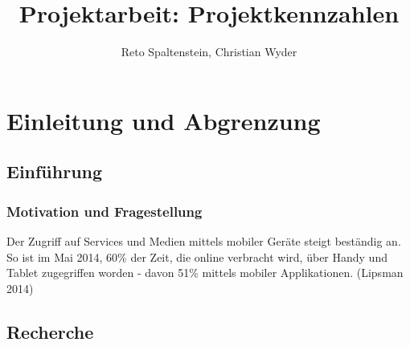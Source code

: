 




\makeatletter
\def\maxwidth{\ifdim\Gin@nat@width>\linewidth\linewidth
\else\Gin@nat@width\fi}
\makeatother
\let\Oldincludegraphics\includegraphics
\renewcommand{\includegraphics}[1]{\Oldincludegraphics[width=\maxwidth]{#1}}

\VerbatimFootnotes

\setlength{\parindent}{0pt}
\setlength{\parskip}{6pt plus 2pt minus 1pt}
\setlength{\emergencystretch}{3em}  %
\providecommand{\tightlist}{%
  \setlength{\itemsep}{0pt}\setlength{\parskip}{0pt}}
\VerbatimFootnotes %

\title{Projektarbeit: Projektkennzahlen}
\author{Reto Spaltenstein, Christian Wyder}



\setcounter{page}{1}


\tableofcontents
\newpage

\part[Präambel]{Einleitung und Abgrenzung}

\chapter{Einführung}\label{einfuxfchrung}

\section{Motivation und
Fragestellung}\label{motivation-und-fragestellung}

Der Zugriff auf Services und Medien mittels mobiler Geräte steigt
beständig an. So ist im Mai 2014, 60\% der Zeit, die online verbracht
wird, über Handy und Tablet zugegriffen worden - davon 51\% mittels
mobiler Applikationen. (Lipsman 2014)

\newpage

\chapter{Recherche}\label{recherche}

